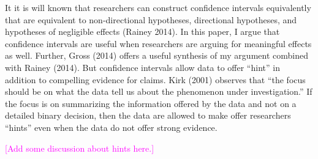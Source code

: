 \documentclass[12pt]{article}
\newcommand{\carlisle}[1]{\textcolor{magenta}{#1}}
\begin{document}
It it is will known that researchers can construct confidence intervals equivalently that are equivalent to non-directional hypotheses, directional hypotheses, and hypotheses of negligible effects (Rainey 2014). In this paper, I argue that confidence intervals are useful when researchers are arguing for meaningful effects as well. Further, Gross (2014) offers a useful synthesis of my argument combined with Rainey (2014). But confidence intervals allow data to offer ``hint'' in addition to compelling evidence for claims. Kirk (2001) observes that ``the focus should be on what the data tell us about the phenomenon under investigation.'' If the focus is on summarizing the information offered by the data and not on a detailed binary decision, then the data are allowed to make offer researchers ``hints'' even when the data do not offer strong evidence.

\carlisle{[Add some discussion about hints here.]}



%
%
\end{document}
